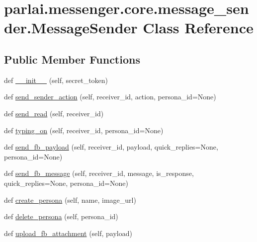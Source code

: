 \hypertarget{classparlai_1_1messenger_1_1core_1_1message__sender_1_1MessageSender}{}\section{parlai.\+messenger.\+core.\+message\+\_\+sender.\+Message\+Sender Class Reference}
\label{classparlai_1_1messenger_1_1core_1_1message__sender_1_1MessageSender}
\subsection*{Public Member Functions}
\begin{DoxyCompactItemize}
\item 
def \hyperlink{classparlai_1_1messenger_1_1core_1_1message__sender_1_1MessageSender_ac39036ce02318777c7c398cffa28e4ff}{\+\_\+\+\_\+init\+\_\+\+\_\+} (self, secret\+\_\+token)
\item 
def \hyperlink{classparlai_1_1messenger_1_1core_1_1message__sender_1_1MessageSender_a58c876784f5800234ed341a160bcf1b5}{send\+\_\+sender\+\_\+action} (self, receiver\+\_\+id, action, persona\+\_\+id=None)
\item 
def \hyperlink{classparlai_1_1messenger_1_1core_1_1message__sender_1_1MessageSender_aa278e80e25fca3b45bc2d6328d08d638}{send\+\_\+read} (self, receiver\+\_\+id)
\item 
def \hyperlink{classparlai_1_1messenger_1_1core_1_1message__sender_1_1MessageSender_af18c8b2ca27ba3ff86eed8175cea2656}{typing\+\_\+on} (self, receiver\+\_\+id, persona\+\_\+id=None)
\item 
def \hyperlink{classparlai_1_1messenger_1_1core_1_1message__sender_1_1MessageSender_a8bc08e730c5d1fbe4c4cc0d96746b30a}{send\+\_\+fb\+\_\+payload} (self, receiver\+\_\+id, payload, quick\+\_\+replies=None, persona\+\_\+id=None)
\item 
def \hyperlink{classparlai_1_1messenger_1_1core_1_1message__sender_1_1MessageSender_ac323160e9bbb201ed0c64b819f1c78ca}{send\+\_\+fb\+\_\+message} (self, receiver\+\_\+id, message, is\+\_\+response, quick\+\_\+replies=None, persona\+\_\+id=None)
\item 
def \hyperlink{classparlai_1_1messenger_1_1core_1_1message__sender_1_1MessageSender_afeadd94dbc8a34f974c799c1b0f7e71c}{create\+\_\+persona} (self, name, image\+\_\+url)
\item 
def \hyperlink{classparlai_1_1messenger_1_1core_1_1message__sender_1_1MessageSender_a1d7388a73e5e7d20f5174fef8b277f4d}{delete\+\_\+persona} (self, persona\+\_\+id)
\item 
def \hyperlink{classparlai_1_1messenger_1_1core_1_1message__sender_1_1MessageSender_af3be069cd31087804241627444abe859}{upload\+\_\+fb\+\_\+attachment} (self, payload)
\end{DoxyCompactItemize}
